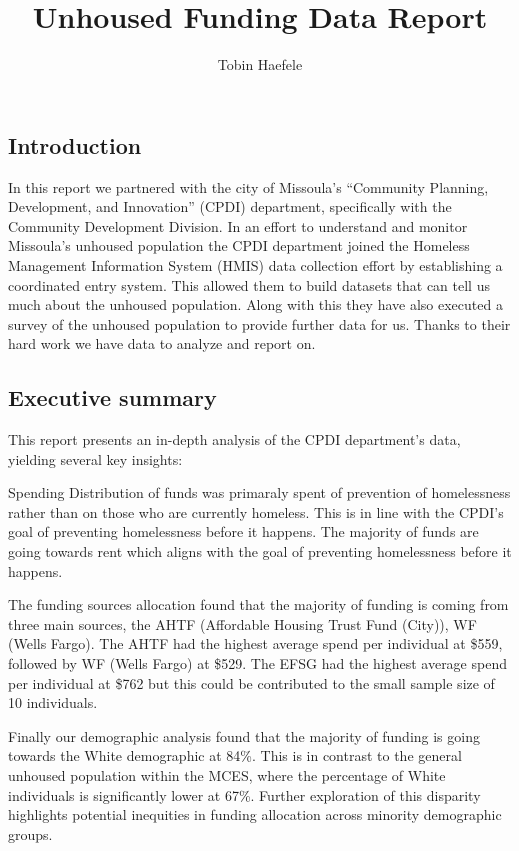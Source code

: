\documentclass[
]{article}
\title{Unhoused Funding Data Report}
\author{Tobin Haefele}
\date{}
\begin{document}
\maketitle

{
\setcounter{tocdepth}{2}
\tableofcontents
}
\subsection{Introduction}\label{introduction}

In this report we partnered with the city of Missoula's ``Community
Planning, Development, and Innovation'' (CPDI) department, specifically
with the Community Development Division. In an effort to understand and
monitor Missoula's unhoused population the CPDI department joined the
Homeless Management Information System (HMIS) data collection effort by
establishing a coordinated entry system. This allowed them to build
datasets that can tell us much about the unhoused population. Along with
this they have also executed a survey of the unhoused population to
provide further data for us. Thanks to their hard work we have data to
analyze and report on.

\subsection{Executive summary}\label{executive-summary}

This report presents an in-depth analysis of the CPDI department's data,
yielding several key insights:

Spending Distribution of funds was primaraly spent of prevention of
homelessness rather than on those who are currently homeless. This is in
line with the CPDI's goal of preventing homelessness before it happens.
The majority of funds are going towards rent which aligns with the goal
of preventing homelessness before it happens.

The funding sources allocation found that the majority of funding is
coming from three main sources, the AHTF (Affordable Housing Trust Fund
(City)), WF (Wells Fargo). The AHTF had the highest average spend per
individual at \$559, followed by WF (Wells Fargo) at \$529. The EFSG had
the highest average spend per individual at \$762 but this could be
contributed to the small sample size of 10 individuals.

Finally our demographic analysis found that the majority of funding is
going towards the White demographic at 84\%. This is in contrast to the
general unhoused population within the MCES, where the percentage of
White individuals is significantly lower at 67\%. Further exploration of
this disparity highlights potential inequities in funding allocation
across minority demographic groups.
\end{document}
